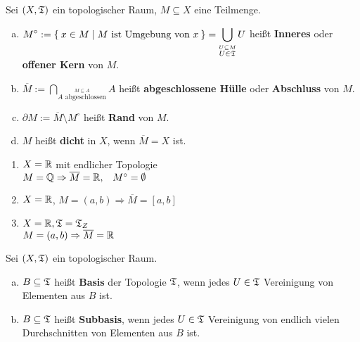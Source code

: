 \begin{definition}
    Sei $(X, \mathfrak{T})$ ein topologischer Raum, $M \subseteq X$ eine Teilmenge.
    \begin{enumerate}[a)]
        \item $\displaystyle M^\circ := \Set{x \in M | M \text{ ist Umgebung von } x} = \bigcup_{\stackrel{U \subseteq M} {U \in \mathfrak{T}}} U $ heißt \textbf{Inneres} oder \textbf{ offener Kern} von $M$.  
        \item $\displaystyle \overline{M} := \bigcap_{\stackrel{M \subseteq A}{A \text{ abgeschlossen}}} A$ heißt \textbf{abgeschlossene Hülle} oder \textbf{Abschluss} von $M$. 
        \item $\partial M := \overline{M} \setminus M^\circ$ heißt \textbf{Rand} von $M$. 
        \item $M$ heißt \textbf{dicht} in $X$, wenn $\overline{M} = X$ ist. 
    \end{enumerate}
\end{definition}

\begin{beispiel}
    \begin{enumerate}[1)]
        \item $X = \mathbb{R}$ mit endlicher Topologie\\
              $M = \mathbb{Q} \Rightarrow \overline{M} = \mathbb{R}, \;\;\; M^\circ = \emptyset$
        \item $X = \mathbb{R}$, $M=(a,b) \Rightarrow \overline{M} = [a,b]$
        \item $X = \mathbb{R}, \mathfrak{T} = \mathfrak{T}_Z$\\
              $M = (a,b) \Rightarrow \overline{M} = \mathbb{R}$
    \end{enumerate}
\end{beispiel}

\begin{definition}  
    Sei $(X, \mathfrak{T})$ ein topologischer Raum.
    \begin{enumerate}[a)]
        \item $B \subseteq \mathfrak{T}$ heißt \textbf{Basis} der Topologie $\mathfrak{T}$,
              wenn jedes $U \in \mathfrak{T}$ Vereinigung von Elementen aus $B$
              ist.
        \item $B \subseteq \mathfrak{T}$ heißt \textbf{Subbasis}, wenn jedes
              $U \in \mathfrak{T}$ Vereinigung von endlich vielen Durchschnitten
              von Elementen aus $B$ ist.
    \end{enumerate}
\end{definition}

